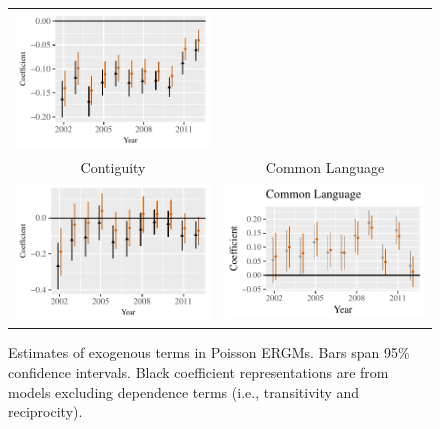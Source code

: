 \documentclass[12pt]{article}
\begin{document}
\begin{figure}[htp]
\begin{tabular}{c@{\hskip -.4cm}c}
\includegraphics[height=.22\textheight, clip=true, trim=.5cm .5cm 0cm .1cm]{draft_figures/rl_plots/Distance.pdf}   \\
Contiguity &
Common Language\\
\includegraphics[height=.22\textheight, clip=true, trim=0cm .5cm 0cm .1cm]{draft_figures/rl_plots/Contiguity.pdf}  &
\includegraphics[height=.22\textheight, clip=true, trim=.5cm .5cm 0cm .1cm]{draft_figures/rl_plots/CommonLanguage.pdf}   \\
\end{tabular}
\caption{\label{fig:effectPlots1} Estimates of exogenous terms in Poisson ERGMs. Bars span 95\% confidence intervals. Black coefficient representations are from models excluding dependence terms (i.e., transitivity and reciprocity).}
\end{figure}
\end{document}
